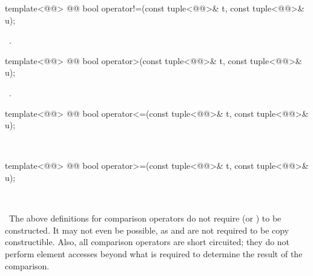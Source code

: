\documentclass[american,twoside]{book}
\begin{document}
%
%
\begin{itemdecl}
template<@@>
  @@
  bool operator!=(const tuple<@@>& t, const tuple<@@>& u);
\end{itemdecl}
\begin{itemdescr}
\pnum\returns\ .
\end{itemdescr}

%
%
\begin{itemdecl}
template<@@>
  @@
  bool operator>(const tuple<@@>& t, const tuple<@@>& u);
\end{itemdecl}
\begin{itemdescr}
\pnum\returns\ .
\end{itemdescr}

%
%
\begin{itemdecl}
template<@@>
  @@
  bool operator<=(const tuple<@@>& t, const tuple<@@>& u);
\end{itemdecl}
\begin{itemdescr}
\pnum\returns\ 
\end{itemdescr}

%
%
\begin{itemdecl}
template<@@>
  @@
  bool operator>=(const tuple<@@>& t, const tuple<@@>& u);
\end{itemdecl}

\begin{itemdescr}
\pnum\returns\ 
\end{itemdescr}

\pnum \enternote\ The above definitions for comparison operators 
do not require  
(or ) to be constructed. It may not 
even be possible, as  and  are not required to be copy
constructible. Also, all comparison operators are short circuited;
they do not perform element accesses beyond what is required to determine the
result of the comparison. \exitnote\
\end{document}

